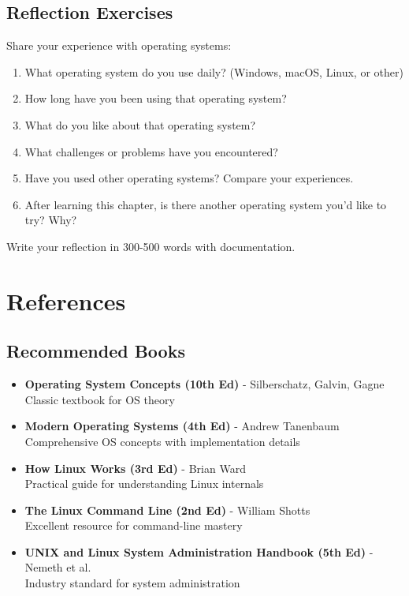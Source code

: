 \subsection{Reflection Exercises}

\begin{exercisebox}[1.6]
Share your experience with operating systems:
\begin{enumerate}
    \item What operating system do you use daily? (Windows, macOS, Linux, or other)
    \item How long have you been using that operating system?
    \item What do you like about that operating system?
    \item What challenges or problems have you encountered?
    \item Have you used other operating systems? Compare your experiences.
    \item After learning this chapter, is there another operating system you'd like to try? Why?
\end{enumerate}
Write your reflection in 300-500 words with documentation.
\end{exercisebox}

\section{References}
\label{sec:references}

\subsection{Recommended Books}

\begin{itemize}
    \item \textbf{Operating System Concepts (10th Ed)} - Silberschatz, Galvin, Gagne \\
    Classic textbook for OS theory

    \item \textbf{Modern Operating Systems (4th Ed)} - Andrew Tanenbaum \\
    Comprehensive OS concepts with implementation details

    \item \textbf{How Linux Works (3rd Ed)} - Brian Ward \\
    Practical guide for understanding Linux internals

    \item \textbf{The Linux Command Line (2nd Ed)} - William Shotts \\
    Excellent resource for command-line mastery

    \item \textbf{UNIX and Linux System Administration Handbook (5th Ed)} - Nemeth et al. \\
    Industry standard for system administration
\end{itemize}

